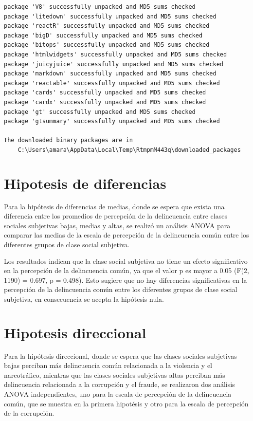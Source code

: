 \documentclass[
  spanish,
  a4paper,
  oneside]{scrbook}
\begin{document}
\begin{verbatim}
package 'V8' successfully unpacked and MD5 sums checked
package 'litedown' successfully unpacked and MD5 sums checked
package 'reactR' successfully unpacked and MD5 sums checked
package 'bigD' successfully unpacked and MD5 sums checked
package 'bitops' successfully unpacked and MD5 sums checked
package 'htmlwidgets' successfully unpacked and MD5 sums checked
package 'juicyjuice' successfully unpacked and MD5 sums checked
package 'markdown' successfully unpacked and MD5 sums checked
package 'reactable' successfully unpacked and MD5 sums checked
package 'cards' successfully unpacked and MD5 sums checked
package 'cardx' successfully unpacked and MD5 sums checked
package 'gt' successfully unpacked and MD5 sums checked
package 'gtsummary' successfully unpacked and MD5 sums checked

The downloaded binary packages are in
    C:\Users\amara\AppData\Local\Temp\RtmpmM443q\downloaded_packages
\end{verbatim}

\section{Hipotesis de diferencias}\label{hipotesis-de-diferencias-1}

Para la hipótesis de diferencias de medias, donde se espera que exista
una diferencia entre los promedios de percepción de la delincuencia
entre clases sociales subjetivas bajas, medias y altas, se realizó un
análisis ANOVA para comparar las medias de la escala de percepción de la
delincuencia común entre los diferentes grupos de clase social
subjetiva.

Los resultados indican que la clase social subjetiva no tiene un efecto
significativo en la percepción de la delincuencia común, ya que el valor
p es mayor a 0.05 (F(2, 1190) = 0.697, p = 0.498). Esto sugiere que no
hay diferencias significativas en la percepción de la delincuencia común
entre los diferentes grupos de clase social subjetiva, en consecuencia
se acepta la hipótesis nula.

\section{Hipotesis direccional}\label{hipotesis-direccional-1}

Para la hipótesis direccional, donde se espera que las clases sociales
subjetivas bajas perciban más delincuencia común relacionada a la
violencia y el narcotráfico, mientras que las clases sociales subjetivas
altas perciban más delincuencia relacionada a la corrupción y el fraude,
se realizaron dos análisis ANOVA independientes, uno para la escala de
percepción de la delincuencia común, que se muestra en la primera
hipotésis y otro para la escala de percepción de la corrupción.
\end{document}

